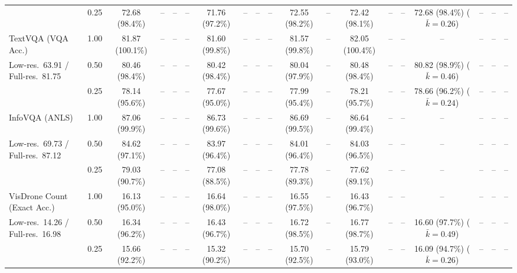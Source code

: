 \begin{table}[t]
{\begin{tabular}{l c | c c c c | c c c c | c c | c c c | c c c c}
 & 0.25 & \cellcolor{gray!15}72.68 (98.4\%) & -- & -- & -- & 71.76 (97.2\%) & -- & -- & -- & \cellcolor{gray!15}72.55 (98.2\%) & -- & \cellcolor{gray!15}72.42 (98.1\%) & -- & -- & \cellcolor{gray!15}72.68 (98.4\%) {\footnotesize ($\bar k{=}0.26$)} & -- & -- & -- \\
\cmidrule(lr){1-19}
TextVQA (VQA Acc.) & 1.00 & \cellcolor{gray!15}81.87 (100.1\%) & -- & -- & -- & \cellcolor{gray!15}81.60 (99.8\%) & -- & -- & -- & \cellcolor{gray!15}81.57 (99.8\%) & -- & \cellcolor{gray!15}82.05 (100.4\%) & -- & -- & -- & -- & -- & -- \\
{\footnotesize Low-res.\ 63.91 / Full-res.\ 81.75} & 0.50 & \cellcolor{gray!15}80.46 (98.4\%) & -- & -- & -- & \cellcolor{gray!15}80.42 (98.4\%) & -- & -- & -- & 80.04 (97.9\%) & -- & \cellcolor{gray!15}80.48 (98.4\%) & -- & -- & \cellcolor{gray!15}80.82 (98.9\%) {\footnotesize ($\bar k{=}0.46$)} & -- & -- & -- \\
 & 0.25 & 78.14 (95.6\%) & -- & -- & -- & 77.67 (95.0\%) & -- & -- & -- & 77.99 (95.4\%) & -- & 78.21 (95.7\%) & -- & -- & 78.66 (96.2\%) {\footnotesize ($\bar k{=}0.24$)} & -- & -- & -- \\
\cmidrule(lr){1-19}
InfoVQA (ANLS) & 1.00 & \cellcolor{gray!15}87.06 (99.9\%) & -- & -- & -- & \cellcolor{gray!15}86.73 (99.6\%) & -- & -- & -- & \cellcolor{gray!15}86.69 (99.5\%) & -- & \cellcolor{gray!15}86.64 (99.4\%) & -- & -- & -- & -- & -- & -- \\
{\footnotesize Low-res.\ 69.73 / Full-res.\ 87.12} & 0.50 & 84.62 (97.1\%) & -- & -- & -- & 83.97 (96.4\%) & -- & -- & -- & 84.01 (96.4\%) & -- & 84.03 (96.5\%) & -- & -- & -- & -- & -- & -- \\
 & 0.25 & 79.03 (90.7\%) & -- & -- & -- & 77.08 (88.5\%) & -- & -- & -- & 77.78 (89.3\%) & -- & 77.62 (89.1\%) & -- & -- & -- & -- & -- & -- \\
\cmidrule(lr){1-19}
VisDrone Count (Exact Acc.) & 1.00 & 16.13 (95.0\%) & -- & -- & -- & 16.64 (98.0\%) & -- & -- & -- & 16.55 (97.5\%) & -- & 16.43 (96.7\%) & -- & -- & -- & -- & -- & -- \\
{\footnotesize Low-res.\ 14.26 / Full-res.\ 16.98} & 0.50 & 16.34 (96.2\%) & -- & -- & -- & 16.43 (96.7\%) & -- & -- & -- & \cellcolor{gray!15}16.72 (98.5\%) & -- & \cellcolor{gray!15}16.77 (98.7\%) & -- & -- & 16.60 (97.7\%) {\footnotesize ($\bar k{=}0.49$)} & -- & -- & -- \\
 & 0.25 & 15.66 (92.2\%) & -- & -- & -- & 15.32 (90.2\%) & -- & -- & -- & 15.70 (92.5\%) & -- & 15.79 (93.0\%) & -- & -- & 16.09 (94.7\%) {\footnotesize ($\bar k{=}0.26$)} & -- & -- & -- \\

\end{tabular}}
\end{table}

